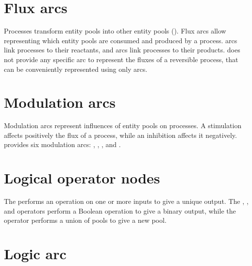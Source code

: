 \section{Flux arcs}
\label{sec:fluxes}

Processes transform entity pools into other entity pools ().
Flux arcs allow representing which entity pools are consumed and produced by a process.
 arcs link processes to their reactants, and  arcs link processes to their products.
\SBGNPDLone does not provide any specific arc to represent the fluxes of a reversible process, that can be conveniently represented using only  arcs.




\section{Modulation arcs}
\label{sec:modulations}

Modulation arcs represent influences of entity pools on processes.
A stimulation affects positively the flux of a process, while an inhibition affects it negatively.
\SBGNPDLone provides six modulation arcs: , , ,  and .







\section{Logical operator nodes}

\label{sec:logic}

The  performs an operation on one or more inputs to give a unique output.
The , , and  operators perform a Boolean operation to give a binary output, while the  operator performs a union of pools to give a new pool.






\section{Logic arc}
\label{sec:logic_arc}




